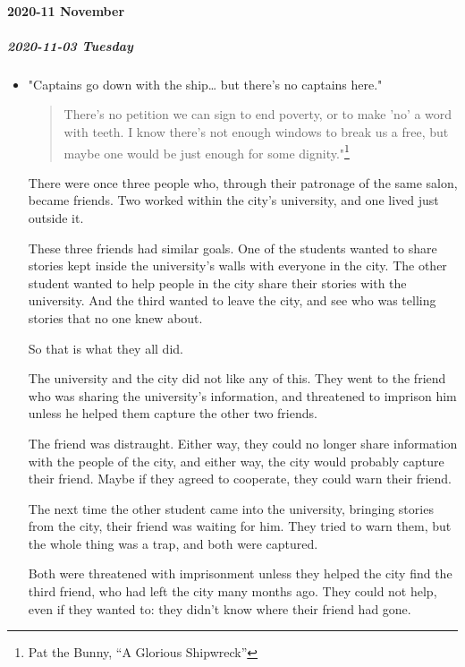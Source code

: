 \documentclass[11pt]{article}
\begin{document}
\paragraph*{2020-11 November}
\label{sec:org8605ad1}
\startcontents[level-4]
\subparagraph*{2020-11-03 Tuesday}
\label{sec:org62c187b}
\begin{itemize}
\item "Captains go down with the ship\ldots{} but there's no captains here."
\label{sec:org87ed6f4}
\begin{quote}
There's no petition we can sign to end poverty, or to make 'no' a word with teeth. I know there's not enough windows to break us a free, but maybe one would be just enough for some dignity."\footnote{Pat the Bunny, “A Glorious Shipwreck”}
\end{quote}

There were once three people who, through their patronage of the same salon, became friends. Two worked within the city's university, and one lived just outside it.

These three friends had similar goals. One of the students wanted to share stories kept inside the university's walls with everyone in the city. The other student wanted to help people in the city share their stories with the university. And the third wanted to leave the city, and see who was telling stories that no one knew about.

So that is what they all did.

The university and the city did not like any of this. They went to the friend who was sharing the university's information, and threatened to imprison him unless he helped them capture the other two friends.

The friend was distraught. Either way, they could no longer share information with the people of the city, and either way, the city would probably capture their friend. Maybe if they agreed to cooperate, they could warn their friend.

The next time the other student came into the university, bringing stories from the city, their friend was waiting for him. They tried to warn them, but the whole thing was a trap, and both were captured.

Both were threatened with imprisonment unless they helped the city find the third friend, who had left the city many months ago. They could not help, even if they wanted to: they didn't know where their friend had gone.


\end{itemize}
\end{document}
